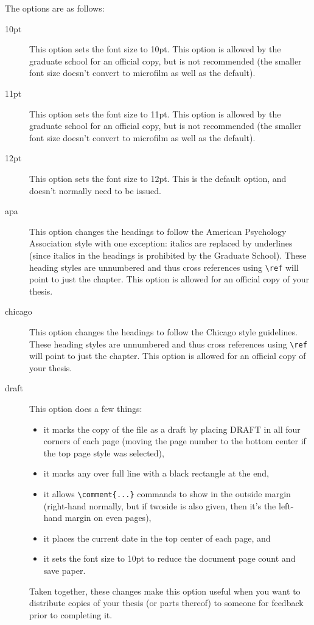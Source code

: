 \pagebreak[3]The options are as follows:
\begin{description}
\item[10pt]{This option sets the font size to 10pt.  This option is allowed by the graduate school for an official copy, but is not recommended (the smaller font size doesn't convert to microfilm as well as the default).}
\item[11pt]{This option sets the font size to 11pt.  This option is allowed by the graduate school for an official copy, but is not recommended (the smaller font size doesn't convert to microfilm as well as the default).}
\item[12pt]{This option sets the font size to 12pt.  This is the default option, and doesn't normally need to be issued.}
\item[apa]{This option changes the headings to follow the American Psychology Association style with one exception: italics are replaced by underlines (since italics in the headings is prohibited by the Graduate School).  These heading styles are unnumbered and thus cross references using \verb=\ref= will point to just the chapter.  This option is allowed for an official copy of your thesis.}
\item[chicago]{This option changes the headings to follow the Chicago style guidelines.  These heading styles are unnumbered and thus cross references using \verb=\ref= will point to just the chapter.  This option is allowed for an official copy of your thesis.}
\item[draft]{This option does a few things:
	\begin{itemize}
	\item{it marks the copy of the file as a draft by placing DRAFT in all four corners of each page (moving the page number to the bottom center if the top page style was selected),}
	\item{it marks any over full line with a black rectangle at the end,}
	\item{it allows \verb=\comment{...}= commands to show in the outside margin (right-hand normally, but if twoside is also given, then it's the left-hand margin on even pages),}
	\item{it places the current date in the top center of each page, and}
	\item{it sets the font size to 10pt to reduce the document page count and save paper.}
	\end{itemize}
Taken together, these changes make this option useful when you want to distribute copies of your thesis (or parts thereof) to someone for feedback prior to completing it.}

\end{description}
